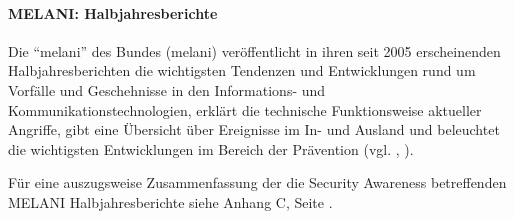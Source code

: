 \documentclass[../../main.tex]{subfiles}
\begin{document}
\paragraph*{MELANI: Halbjahresberichte}\mbox{}

\begin{sloppypar}
Die "`\acrlong{melani}"' des Bundes (\acrshort{melani}) veröffentlicht in ihren seit 2005 erscheinenden Halbjahresberichten die wichtigsten Tendenzen und Entwicklungen rund um Vorfälle und Geschehnisse in den Informations- und Kommunikationstechnologien, erklärt die technische Funktionsweise aktueller Angriffe, gibt eine Übersicht über Ereignisse im In- und Ausland und beleuchtet die wichtigsten Entwicklungen im Bereich der Prävention (vgl. \citeauthor{melani_lageberichte_2016}, \citeyear{melani_lageberichte_2016}).

Für eine auszugsweise Zusammenfassung der die Security Awareness betreffenden MELANI Halbjahresberichte siehe Anhang C, Seite \pageref{melani_halbjahresberichte}. 
\end{sloppypar}
\end{document}
